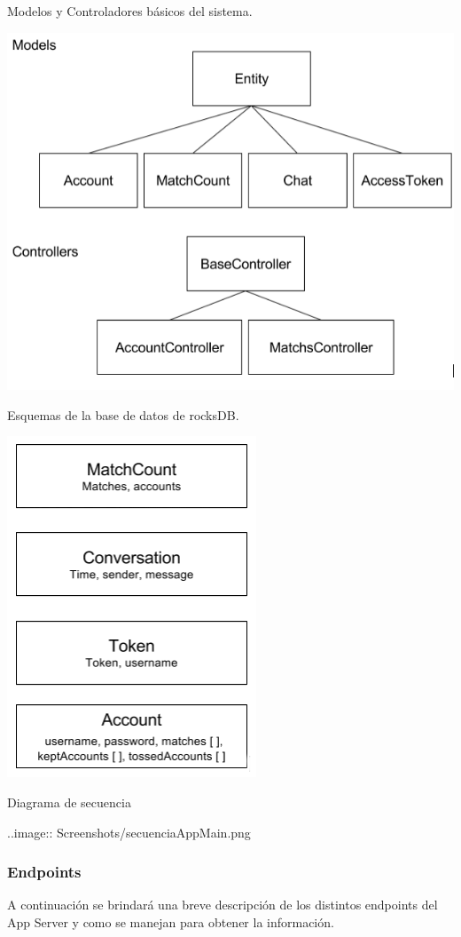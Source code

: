 \documentclass[letterpaper,10pt,english]{sphinxmanual}
\begin{document}
Modelos y Controladores básicos del sistema.

\includegraphics{classesapp.png}

Esquemas de la base de datos de rocksDB.

\includegraphics{rocksdb.png}

Diagrama de secuencia

..image:: Screenshots/secuenciaAppMain.png


\subsubsection{Endpoints}
\label{manuals:endpoints}
A continuación se brindará una breve descripción de los distintos endpoints del App Server y como se manejan para obtener la información.
\end{document}

